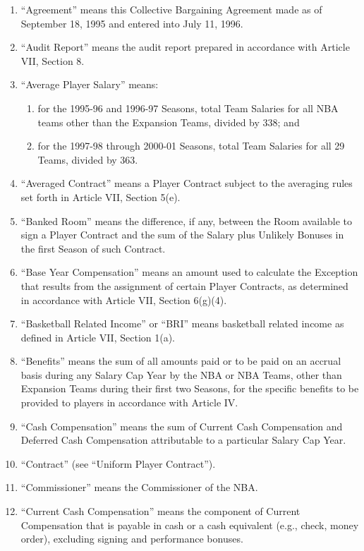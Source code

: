 \documentclass[
]{book}
\providecommand{\tightlist}{%
  \setlength{\itemsep}{0pt}\setlength{\parskip}{0pt}}
\begin{document}
\begin{enumerate}
\def\labelenumi{\arabic{enumi}.}
\tightlist
\item
  ``Agreement'' means this Collective Bargaining Agreement made as of September 18, 1995 and entered into July 11, 1996.
\item
  ``Audit Report'' means the audit report prepared in accordance with Article VII, Section 8.
\item
  ``Average Player Salary'' means:

  \begin{enumerate}
  \def\labelenumii{\arabic{enumii}.}
  \tightlist
  \item
    for the 1995-96 and 1996-97 Seasons, total Team Salaries for all NBA teams other than the Expansion Teams, divided by 338; and
  \item
    for the 1997-98 through 2000-01 Seasons, total Team Salaries for all 29 Teams, divided by 363.
  \end{enumerate}
\item
  ``Averaged Contract'' means a Player Contract subject to the averaging rules set forth in Article VII, Section 5(e).
\item
  ``Banked Room'' means the difference, if any, between the Room available to sign a Player Contract and the sum of the Salary plus Unlikely Bonuses in the first Season of such Contract.
\item
  ``Base Year Compensation'' means an amount used to calculate the Exception that results from the assignment of certain Player Contracts, as determined in accordance with Article VII, Section 6(g)(4).
\item
  ``Basketball Related Income'' or ``BRI'' means basketball related income as defined in Article VII, Section 1(a).
\item
  ``Benefits'' means the sum of all amounts paid or to be paid on an accrual basis during any Salary Cap Year by the NBA or NBA Teams, other than Expansion Teams during their first two Seasons, for the specific benefits to be provided to players in accordance with Article IV.
\item
  ``Cash Compensation'' means the sum of Current Cash Compensation and Deferred Cash Compensation attributable to a particular Salary Cap Year.
\item
  ``Contract'' (see ``Uniform Player Contract'').
\item
  ``Commissioner'' means the Commissioner of the NBA.
\item
  ``Current Cash Compensation'' means the component of Current Compensation that is payable in cash or a cash equivalent (e.g., check, money order), excluding signing and performance bonuses.

\end{enumerate}
\end{document}
